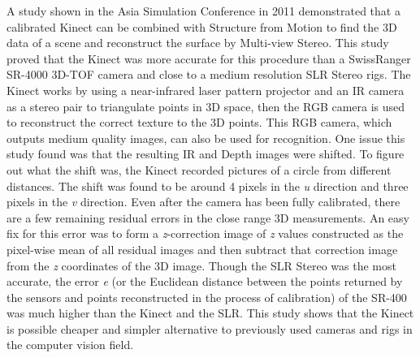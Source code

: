 \documentclass[12pt,twocolumn]{article}
\begin{document}
\indent	 A study shown in the Asia Simulation Conference in 2011 demonstrated that a calibrated Kinect can be combined with Structure from Motion to find the 3D data of a scene and reconstruct the surface by Multi-view Stereo. This study proved that the Kinect was more accurate for this procedure than a SwissRanger SR-4000 3D-TOF camera and close to a medium resolution SLR Stereo rigs. The Kinect works by using a near-infrared laser pattern projector and an IR camera as a stereo pair to triangulate points in 3D space, then the RGB camera is used to reconstruct the correct texture to the 3D points. This RGB camera, which outputs medium quality images, can also be used for recognition. One issue this study found was that the resulting IR and Depth images were shifted. To figure out what the shift was, the Kinect recorded pictures of a circle from different distances. The shift was found to be around 4 pixels in the \emph{u} direction and three pixels in the \emph{v} direction. Even after the camera has been fully calibrated, there are a few remaining residual errors in the close range 3D measurements. An easy fix for this error was to form a \emph{z}-correction image of \emph{z} values constructed as the pixel-wise mean of all residual images and then subtract that correction image from the \emph{z} coordinates of the 3D image.\cite{cite1} Though the SLR Stereo was the most accurate, the error \emph{e} (or the Euclidean distance between the points returned by the sensors and points reconstructed in the process of calibration) of the SR-400 was much higher than the Kinect and the SLR. This study shows that the Kinect is possible cheaper and simpler alternative to previously used cameras and rigs in the computer vision field.\\
\end{document}
